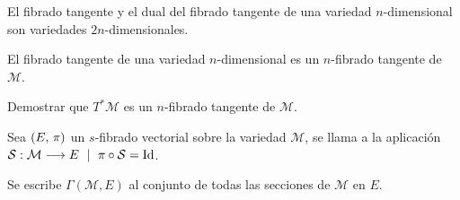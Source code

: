 \begin{exercise}
  El fibrado tangente y el dual del fibrado tangente de una variedad $n$-dimensional son variedades
  $2n$-dimensionales.
\end{exercise}

\begin{result}
El fibrado tangente de una variedad $n$-dimensional es un $n$-fibrado tangente de $\mathcal{M}$.
\end{result}

\begin{exercise}
  Demostrar que $T^*\mathcal{M}$ es un $n$-fibrado tangente de $\mathcal{M}$.
\end{exercise}

\begin{definition}
  Sea $(E,\thinspace\pi)$ un $s$-fibrado vectorial sobre la variedad $\mathcal{M}$, se llama  a la
  aplicación $\maps{\mathcal{S}}{\mathcal{M}}{E}\ \mid\ \pi\circ\mathcal{S}=\operatorname{Id}$.
\end{definition}
\begin{notation}
  Se escribe $\Gamma(\mathcal{M},E)$ al conjunto de todas las secciones de $\mathcal{M}$ en $E$.
\end{notation}
